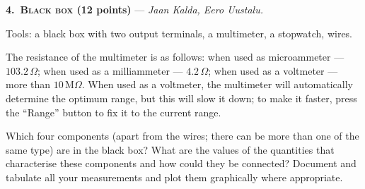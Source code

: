 \textbf{4.\ \textsc{Black box} (12 points)} --- \textit{Jaan Kalda, Eero Uustalu.}

Tools: a black box with two output terminals, a multimeter, a stopwatch, wires.

The resistance of the multimeter is as follows: when used as microammeter ---
$103.2\,\Omega$; when used as a milliammeter --- $4.2\,\Omega$; when used as a
voltmeter --- more than $10\,\mathrm{M}\Omega$. When used as a voltmeter, the
multimeter will automatically determine the optimum range, but this will slow
it down; to make it faster, press the ``Range'' button to fix it to the current
range.

Which four components (apart from the wires; there can be more than one of the
same type) are in the black box? What are the values of the quantities that
characterise these components and how could they be connected? Document and
tabulate all your measurements and plot them graphically where appropriate.
